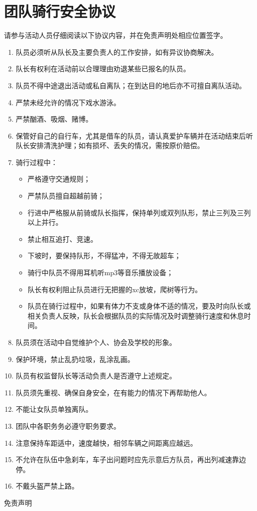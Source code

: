 \documentclass{ctexbook}
\begin{document}
\section{团队骑行安全协议}
请参与活动人员仔细阅读以下协议内容，并在免责声明处相应位置签字。
\begin{enumerate}[label={\chinese*、}]

\item 队员必须听从队长及主要负责人的工作安排，如有异议协商解决。

\item 队长有权利在活动前以合理理由劝退某些已报名的队员。

\item 队员不得中途退出活动或私自离队；在到达目的地后亦不可擅自离队活动。

\item 严禁未经允许的情况下戏水游泳。

\item 严禁酗酒、吸烟、赌博。

\item 保管好自己的自行车，尤其是借车的队员，请认真爱护车辆并在活动结束后听队长安排清洗护理；如有损坏、丢失的情况，需按原价赔偿。

\item 骑行过程中：
\begin{itemize}
\item 严格遵守交通规则；
\item 严禁队员擅自超越前骑；
\item 行进中严格服从前骑或队长指挥，保持单列或双列队形，禁止三列及三列以上并行。
\item 禁止相互追打、竞速。
\item 下坡时，要保持队形，不得猛冲，不得无故超车；
\item 骑行中队员不得用耳机听mp3等音乐播放设备；
\item 队长有权利阻止队员进行无把握的xc放坡，爬树等行为。
\item 队员在骑行过程中，如果有体力不支或身体不适的情况，要及时向队长或相关负责人反映，队长会根据队员的实际情况及时调整骑行速度和休息时间。
\end{itemize}
\item 队员须在活动中自觉维护个人、协会及学校的形象。
\item 保护环境，禁止乱扔垃圾，乱涂乱画。
\item 队员有权监督队长等活动负责人是否遵守上述规定。
\item 队员须先重视、确保自身安全，在有能力的情况下再帮助他人。
\item 不能让女队员单独离队。
\item 团队中各职务务必遵守职务要求。
\item 注意保持车距适中，速度越快，相邻车辆之间距离应越远。
\item 不允许在队伍中急刹车，车子出问题时应先示意后方队员，再出列减速靠边停。

\item 不戴头盔严禁上路。

\end{enumerate}
\newpage
\thispagestyle{empty}
\begin{center}
\heiti\Huge 免责声明
\end{center}
\end{document}
